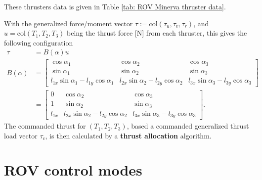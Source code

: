 \documentclass[a4paper,twoside,english]{report}
\begin{document}
These thrusters data is given in Table \ref{tab: ROV Minerva thruster data}.

With the generalized force/moment vector $\tau:=\text{col}(\tau_{u},\tau_{v},\tau_{r})$,
and $u=\text{col}(T_{1},T_{2},T_{3})$ being the thrust force {[}N{]}
from each thruster, this gives the following configuration 
\begin{align}
\tau & =B(\alpha)u\\
B(\alpha) & =\left[\begin{array}{ccc}
\cos\alpha_{1} & \cos\alpha_{2} & \cos\alpha_{3}\\
\sin\alpha_{1} & \sin\alpha_{2} & \sin\alpha_{3}\\
l_{1x}\sin\alpha_{1}-l_{1y}\cos\alpha_{1} & l_{2x}\sin\alpha_{2}-l_{2y}\cos\alpha_{2} & l_{3x}\sin\alpha_{3}-l_{3y}\cos\alpha_{3}
\end{array}\right]\nonumber \\
 & =\left[\begin{array}{ccc}
0 & \cos\alpha_{2} & \cos\alpha_{3}\\
1 & \sin\alpha_{2} & \sin\alpha_{3}\\
l_{1x} & l_{2x}\sin\alpha_{2}-l_{2y}\cos\alpha_{2} & l_{3x}\sin\alpha_{3}-l_{3y}\cos\alpha_{3}
\end{array}\right].\nonumber 
\end{align}
The commanded thrust for $(T_{1},T_{2},T_{3})$, based a commanded
generalized thrust load vector $\tau_{c}$, is then calculated by
a \textbf{thrust allocation} algorithm.

\section{ROV control modes}
\end{document}
